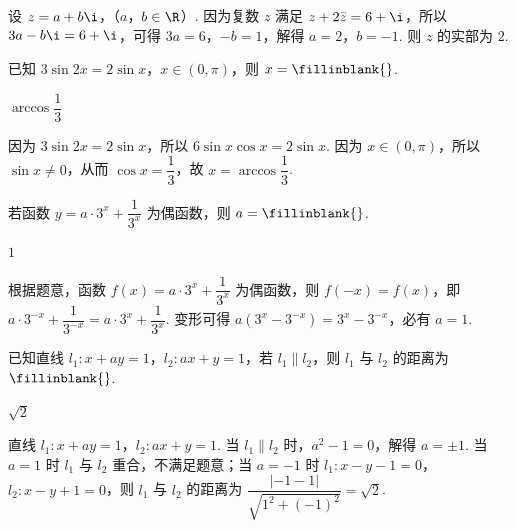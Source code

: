 \begin{solution}
设 \(z=a+b\i\)，（\(a\)，\(b\in\R\)）. 因为复数 \(z\) 满足 \(z+2\bar z=6+\i\)，所以 \(3a-b\i=6+\i\)，可得 \(3a=6\)，\(-b=1\)，解得 \(a=2\)，\(b=-1\). 则 \(z\) 的实部为 \(2\).
\end{solution}

\begin{problem}
已知 \(3\sin 2x=2\sin x\)，\(x\in(0,\pi)\)，则 \(x=\fillinblank{}\).
\end{problem}

\begin{answer}
\(\arccos\dfrac{1}{3}\)
\end{answer}

\begin{solution}
因为 \(3\sin 2x=2\sin x\)，所以 \(6\sin x\cos x=2\sin x\). 因为 \(x\in(0,\pi)\)，所以 \(\sin x\ne0\)，从而 \(\cos x=\dfrac{1}{3}\)，故 \(x=\arccos\dfrac{1}{3}\).
\end{solution}

\begin{problem}
若函数 \(y=a\cdot3^x+\dfrac{1}{3^x}\) 为偶函数，则 \(a=\fillinblank{}\).
\end{problem}

\begin{answer}
\(1\)
\end{answer}

\begin{solution}
根据题意，函数 \(f(x)=a\cdot3^x+\dfrac{1}{3^x}\) 为偶函数，则 \(f(-x)=f(x)\)，即 \(a\cdot3^{-x}+\dfrac{1}{3^{-x}}=a\cdot3^x+\dfrac{1}{3^x}\). 变形可得 \(a(3^x-3^{-x})=3^x-3^{-x}\)，必有 \(a=1\).
\end{solution}

\begin{problem}
已知直线 \(l_1:x+ay=1\)，\(l_2:ax+y=1\)，若 \(l_1\parallel l_2\)，则 \(l_1\) 与 \(l_2\) 的距离为 \(\fillinblank{}\).
\end{problem}

\begin{answer}
\(\sqrt{2}\)
\end{answer}

\begin{solution}
直线 \(l_1:x+ay=1\)，\(l_2:ax+y=1\). 当 \(l_1\parallel l_2\) 时，\(a^2-1=0\)，解得 \(a=\pm1\). 当 \(a=1\) 时 \(l_1\) 与 \(l_2\) 重合，不满足题意；当 \(a=-1\) 时 \(l_1:x-y-1=0\)，\(l_2:x-y+1=0\)，则 \(l_1\) 与 \(l_2\) 的距离为 \(\dfrac{|-1-1|}{\sqrt{1^2+(-1)^2}}=\sqrt{2}\).
\end{solution}

